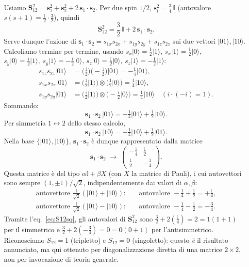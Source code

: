 \documentclass[11pt,a4paper]{article}
\newcommand{\ket}[1]{\lvert #1\rangle}
\newcommand{\vs}[1]{\mathbf{s}_{#1}}
\begin{document}
Usiamo $\mathbf S_{12}^2 = \vs1^2+\vs2^2+2\,\vs1\cdot\vs2$. Per due spin $1/2$,
$\vs{i}^2=\tfrac34\,\mathbb{I}$ (autovalore $s(s+1)=\tfrac12\cdot\tfrac32$), quindi
\begin{equation}
\mathbf S_{12}^2 = \frac32\,\mathbb{I} + 2\,\vs1\cdot\vs2 .
\label{eq:S12sq}
\end{equation}
Serve dunque l'azione di $\vs1\cdot\vs2 = s_{1x}s_{2x}+s_{1y}s_{2y}+s_{1z}s_{2z}$
sui due vettori $\ket{01},\ket{10}$. Calcoliamo termine per termine, usando
$s_x\ket{0}=\tfrac12\ket1,\ s_x\ket1=\tfrac12\ket0$, $s_y\ket0=\tfrac i2\ket1,\
s_y\ket1=-\tfrac i2\ket0$, $s_z\ket0=\tfrac12\ket0,\ s_z\ket1=-\tfrac12\ket1$:
\begin{align*}
s_{1z}s_{2z}\ket{01} &= \Big(\tfrac12\Big)\Big({-}\tfrac12\Big)\ket{01} = -\tfrac14\ket{01},\\
s_{1x}s_{2x}\ket{01} &= \big(\tfrac12\ket1\big)\otimes\big(\tfrac12\ket0\big) = \tfrac14\ket{10},\\
s_{1y}s_{2y}\ket{01} &= \big(\tfrac i2\ket1\big)\otimes\big({-}\tfrac i2\ket0\big) = \tfrac14\ket{10}
\quad (i\cdot(-i)=1).
\end{align*}
Sommando:
\begin{equation}
\vs1\cdot\vs2\,\ket{01} = -\tfrac14\ket{01} + \tfrac12\ket{10}.
\label{eq:sdot01}
\end{equation}
Per simmetria $1\leftrightarrow2$ dello stesso calcolo,
\begin{equation}
\vs1\cdot\vs2\,\ket{10} = -\tfrac14\ket{10} + \tfrac12\ket{01}.
\label{eq:sdot10}
\end{equation}
Nella base $\{\ket{01},\ket{10}\}$, $\vs1\cdot\vs2$ è dunque rappresentato dalla matrice
\begin{equation}
\vs1\cdot\vs2 \;\longrightarrow\;
\begin{pmatrix} -\tfrac14 & \tfrac12\\[2pt] \tfrac12 & -\tfrac14\end{pmatrix}.
\end{equation}
Questa matrice è del tipo $\alpha\mathbb{I}+\beta X$ (con $X$ la matrice di Pauli),
i cui autovettori sono sempre $(1,\pm1)/\sqrt2$, indipendentemente dai valori di
$\alpha,\beta$:
\begin{align}
\text{autovettore } \tfrac{1}{\sqrt2}(\ket{01}+\ket{10}): &\quad
\text{autovalore } -\tfrac14+\tfrac12 = +\tfrac14,\\
\text{autovettore } \tfrac{1}{\sqrt2}(\ket{01}-\ket{10}): &\quad
\text{autovalore } -\tfrac14-\tfrac12 = -\tfrac34.
\end{align}
Tramite l'eq.~\eqref{eq:S12sq}, gli autovalori di $\mathbf S_{12}^2$ sono
$\tfrac32+2(\tfrac14)=2=1(1{+}1)$ per il simmetrico e $\tfrac32+2({-}\tfrac34)=0=0(0{+}1)$
per l'antisimmetrico. Riconosciamo $S_{12}=1$ (tripletto) e $S_{12}=0$ (singoletto):
questo \emph{è} il risultato annunciato, ma qui ottenuto per diagonalizzazione
diretta di una matrice $2\times2$, non per invocazione di teoria generale.
\end{document}
